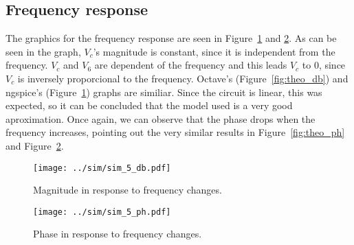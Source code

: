 \subsection{Frequency response}
\tab The graphics for the frequency response are seen in Figure~\ref{fig:db} and \ref{fig:ph}. As can be seen in the graph, $V_c$'s magnitude is constant, since it is independent from the frequency. $V_c$ and $V_6$ are dependent of the frequency and this leads $V_c$ to 0, since $V_c$ is inversely proporcional to the frequency.
Octave's (Figure~\ref{fig:theo_db}) and ngspice's (Figure~\ref{fig:db}) graphs are similiar. Since the circuit is linear, this was expected, so it can be concluded that the model used is a very good aproximation. Once again, we can observe that the phase drops when the frequency increases, pointing out the very similar results in Figure~\ref{fig:theo_ph} and Figure~\ref{fig:ph}.

\begin{figure}[H] \centering
\texttt{[image: ../sim/sim\_5\_db.pdf]}
\caption{Magnitude in response to frequency changes.}
\label{fig:db}
\end{figure}

\begin{figure}[H] \centering
\texttt{[image: ../sim/sim\_5\_ph.pdf]}
\caption{Phase in response to frequency changes.}
\label{fig:ph}
\end{figure}

\newpage
